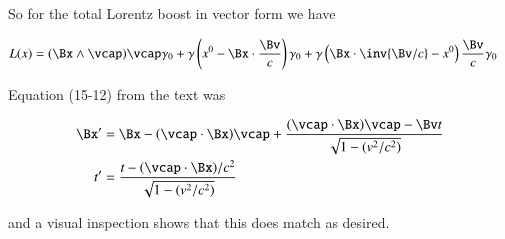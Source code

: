 \documentclass{article}
\begin{document}
So for the total Lorentz boost in vector form we have

\begin{align}
L(x)
&=
(\Bx \wedge \vcap) \vcap \gamma_0 +
\gamma \left(x^0 - \Bx \cdot \frac{\Bv}{c} \right) \gamma_0
+ \gamma \left( \Bx \cdot \inv{\Bv/c} - x^0 \right) \frac{\Bv}{c} \gamma_0
\end{align}

Equation (15-12) from the text was

\begin{align*}
\Bx' 
&= \Bx - (\vcap \cdot \Bx) \vcap + \frac{ (\vcap \cdot \Bx )\vcap - \Bv t }{ \sqrt{1 - (v^2/c^2)} } \\
t' 
&= \frac{ t - (\vcap \cdot \Bx )/c^2 }{ \sqrt{1 - (v^2/c^2)} } \\
\end{align*}

and a visual inspection shows that this does match as desired.



\end{document}
